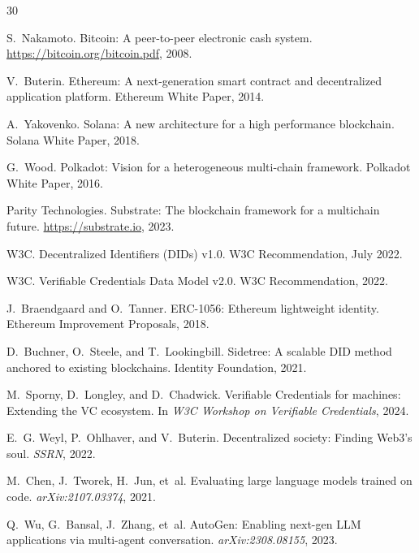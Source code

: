 \documentclass[conference]{IEEEtran}
\begin{document}

\begin{thebibliography}{30}

S.~Nakamoto.
\newblock Bitcoin: A peer-to-peer electronic cash system.
\newblock \url{https://bitcoin.org/bitcoin.pdf}, 2008.

V.~Buterin.
\newblock Ethereum: A next-generation smart contract and decentralized application platform.
\newblock Ethereum White Paper, 2014.

A.~Yakovenko.
\newblock Solana: A new architecture for a high performance blockchain.
\newblock Solana White Paper, 2018.

G.~Wood.
\newblock Polkadot: Vision for a heterogeneous multi-chain framework.
\newblock Polkadot White Paper, 2016.

Parity Technologies.
\newblock Substrate: The blockchain framework for a multichain future.
\newblock \url{https://substrate.io}, 2023.

W3C.
\newblock Decentralized Identifiers (DIDs) v1.0.
\newblock W3C Recommendation, July 2022.

W3C.
\newblock Verifiable Credentials Data Model v2.0.
\newblock W3C Recommendation, 2022.

J.~Braendgaard and O.~Tanner.
\newblock ERC-1056: Ethereum lightweight identity.
\newblock Ethereum Improvement Proposals, 2018.

D.~Buchner, O.~Steele, and T.~Lookingbill.
\newblock Sidetree: A scalable DID method anchored to existing blockchains.
\newblock Identity Foundation, 2021.

M.~Sporny, D.~Longley, and D.~Chadwick.
\newblock Verifiable Credentials for machines: Extending the VC ecosystem.
\newblock In \emph{W3C Workshop on Verifiable Credentials}, 2024.

E.~G. Weyl, P.~Ohlhaver, and V.~Buterin.
\newblock Decentralized society: Finding {W}eb3's soul.
\newblock \emph{SSRN}, 2022.

M.~Chen, J.~Tworek, H.~Jun, et~al.
\newblock Evaluating large language models trained on code.
\newblock \emph{arXiv:2107.03374}, 2021.

Q.~Wu, G.~Bansal, J.~Zhang, et~al.
\newblock Auto{G}en: Enabling next-gen {LLM} applications via multi-agent conversation.
\newblock \emph{arXiv:2308.08155}, 2023.


\end{thebibliography}
\end{document}
